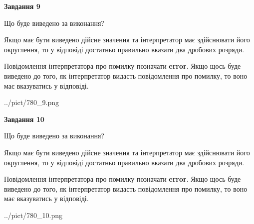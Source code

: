 \documentclass[12pt, ukrainian]{article}
\begin{document}
{\begin {Large}
{\begin {center}\textbf{Завдання 9}\end {center}}\par
Що буде виведено за виконання? \par

Якщо має бути виведено дійсне значення та інтерпретатор має здійснювати його округлення, 
то у відповіді достатньо правильно вказати два дробових розряди.

Повідомлення інтерпретатора про помилку позначати \textbf{error}.
Якщо щось буде виведено до того, як інтерпретатор видасть повідомлення про помилку, 
то воно має вказуватись у відповіді. \par

\begin{center}
	{../pict/780_9.png}
\end{center}
\newpage

{\begin {center}\textbf{Завдання 10}\end {center}}\par
Що буде виведено за виконання? \par

Якщо має бути виведено дійсне значення та інтерпретатор має здійснювати його округлення, 
то у відповіді достатньо правильно вказати два дробових розряди.

Повідомлення інтерпретатора про помилку позначати \textbf{error}.
Якщо щось буде виведено до того, як інтерпретатор видасть повідомлення про помилку, 
то воно має вказуватись у відповіді. \par

\begin{center}
	{../pict/780_10.png}
\end{center}
\newpage

\end {Large}}
\end{document}
